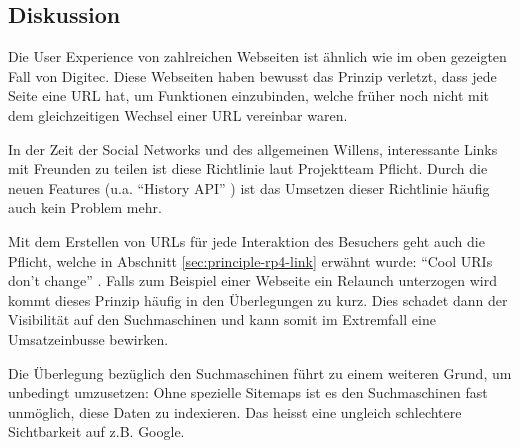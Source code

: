 \subsection*{Diskussion}
Die User Experience von zahlreichen Webseiten ist ähnlich wie im oben gezeigten Fall von Digitec. Diese Webseiten haben bewusst das Prinzip verletzt, dass jede Seite eine \gls{URL} hat, um Funktionen einzubinden, welche früher noch nicht mit dem gleichzeitigen Wechsel einer \gls{URL} vereinbar waren.

In der Zeit der Social Networks und des allgemeinen Willens, interessante Links mit Freunden zu teilen ist diese Richtlinie laut Projektteam Pflicht. Durch die neuen Features (u.a. ``History API'' \cite{HistoryAPI}) ist das Umsetzen dieser Richtlinie häufig auch kein Problem mehr.

Mit dem Erstellen von \glspl{URL} für jede Interaktion des Besuchers geht auch die Pflicht, welche in Abschnitt \ref{sec:principle-rp4-link}  erwähnt wurde: ``Cool URIs don't change''  \cite{CoolURIsTBL}. Falls zum Beispiel einer Webseite ein Relaunch unterzogen wird kommt dieses Prinzip häufig in den Überlegungen zu kurz. Dies schadet dann der Visibilität auf den Suchmaschinen und kann somit im Extremfall eine Umsatzeinbusse bewirken.

Die Überlegung bezüglich den Suchmaschinen führt zu einem weiteren Grund, um  unbedingt umzusetzen: Ohne spezielle Sitemaps \cite{Sitemap} ist es den Suchmaschinen fast unmöglich, diese Daten zu indexieren. Das heisst eine ungleich schlechtere Sichtbarkeit auf z.B. Google.